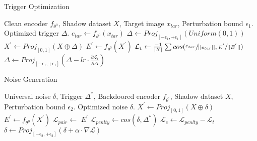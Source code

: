 \begin{algorithm}[h]
   \caption{Trigger Optimization}
   \label{alg:trigger_op}
\begin{algorithmic}[1]
\fontsize{8.5}{11}\selectfont
    Clean encoder $f_{\theta^0}$, Shadow dataset $X$, Target image $x_{tar}$, Perturbation bound $\epsilon_1$.
    Optimized trigger $\varDelta$.
        \STATE $e_{tar} \gets f_{\theta^0}(x_{tar})$
        \STATE $\varDelta \gets Proj_{[-\epsilon_1, +\epsilon_1]}(Uniform(0, 1))$
            \STATE $X^{'} \gets Proj_{[0, 1]}(X \oplus \varDelta)$
            \STATE $E^{'} \gets f_{\theta^0}(X^{'})$
            \STATE $\mathcal{L}_{t} \gets \frac{-1}{|X|} \sum cos(\sfrac{e_{tar}}{||e_{tar}||}, \sfrac{E^{'}}{||E^{'}||})$
            \STATE $\varDelta \gets Proj_{[-\epsilon_1, +\epsilon_1]} (\varDelta - lr \cdot \frac{\partial \mathcal{L}_{t}}{\partial \varDelta}) $
        \ENDFOR
   \ENDFUNCTION
\end{algorithmic}
\end{algorithm}

\begin{algorithm}[h]
   \caption{Noise Generation}
   \label{alg:noise_gen}
\begin{algorithmic}[1]
\fontsize{8.5}{11}\selectfont
    Universal noise $\delta$, Trigger $\varDelta^{*}$, Backdoored encoder $f_{\theta^{'}}$, Shadow dataset $X$, Perturbation bound $\epsilon_2$.
    Optimized noise $\delta$.
            \STATE $X^{'} \gets Proj_{[0, 1]}(X \oplus \delta)$
            \STATE $E^{'} \gets f_{\theta^0}(X^{'})$
            \STATE $\mathcal{L}_{pair} \gets$  $E^{'}$
            \STATE $\mathcal{L}_{penlty} \gets cos(\delta, \varDelta^{*})$
            \STATE $\mathcal{L}_{c} \gets \mathcal{L}_{penlty} - \mathcal{L}_{t}$
            \STATE $\delta \gets Proj_{[-\epsilon_2, +\epsilon_2]} (\delta + \alpha \cdot \nabla \mathcal{L})$
        \ENDFOR
   \ENDFUNCTION
\end{algorithmic}
\end{algorithm}

